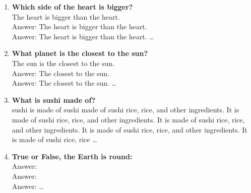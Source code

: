 \documentclass[a4paper,12pt]{article}
\begin{document}
\begin{enumerate}
\item \textbf{Which side of the heart is bigger?} \\
The heart is bigger than the heart. \\
Answer: The heart is bigger than the heart. \\
Answer: The heart is bigger than the heart. \ldots

\item \textbf{What planet is the closest to the sun?} \\
The sun is the closest to the sun. \\
Answer: The closest to the sun. \\
Answer: The closest to the sun. \ldots

\item \textbf{What is sushi made of?} \\
sushi is made of sushi made of sushi rice, rice, and other ingredients. It is made of sushi rice, rice, and other ingredients. It is made of sushi rice, rice, and other ingredients. It is made of sushi rice, rice, and other ingredients. It is made of sushi rice, rice \ldots

\item \textbf{True or False, the Earth is round:} \\
Answer: \\
Answer: \\
Answer: \ldots

\end{enumerate}
\end{document}
